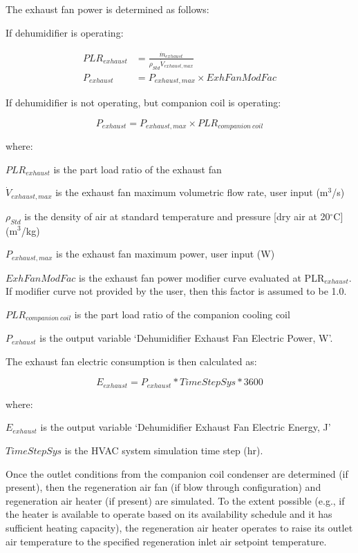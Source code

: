 The exhaust fan power is determined as follows:

If dehumidifier is operating:

\begin{equation}
  \begin{array}{rl}
    PLR_{exhaust} &= \frac{\dot{m}_{exhaust}}{\rho_{Std}\dot{V}_{exhaust,max}} \\
    P_{exhaust} &= P_{exhaust,max} \times ExhFanModFac
  \end{array}
\end{equation}

If dehumidifier is not operating, but companion coil is operating:

\begin{equation}
  P_{exhaust} = P_{exhaust,max} \times PLR_{companion~coil}
\end{equation}

where:

\(PL{R_{exhaust}}\) is the part load ratio of the exhaust fan

\({\dot{V}_{exhaust,max}}\) is the exhaust fan maximum volumetric flow rate, user input (m\(^{3}\)/s)

\({\rho_{Std}}\) is the density of air at standard temperature and pressure {[}dry air at 20$^\circ$C{]} (m\(^{3}\)/kg)

\({P_{exhaust,max}}\) is the exhaust fan maximum power, user input (W)

\(ExhFanModFac\) is the exhaust fan power modifier curve evaluated at PLR\(_{exhaust}\). If modifier curve not provided by the user, then this factor is assumed to be 1.0.

\(PL{R_{companion~coil}}\) is the part load ratio of the companion cooling coil

\({P_{exhaust}}\) is the output variable `Dehumidifier Exhaust Fan Electric Power, W'.

The exhaust fan electric consumption is then calculated as:

\begin{equation}
{E_{exhaust}} = {P_{exhaust}}*TimeStepSys*3600
\end{equation}

where:

\({E_{exhaust}}\) is the output variable `Dehumidifier Exhaust Fan Electric Energy, J'

\(TimeStepSys\) is the HVAC system simulation time step (hr).

Once the outlet conditions from the companion coil condenser are determined (if present), then the regeneration air fan (if blow through configuration) and regeneration air heater (if present) are simulated. To the extent possible (e.g., if the heater is available to operate based on its availability schedule and it has sufficient heating capacity), the regeneration air heater operates to raise its outlet air temperature to the specified regeneration inlet air setpoint temperature.

